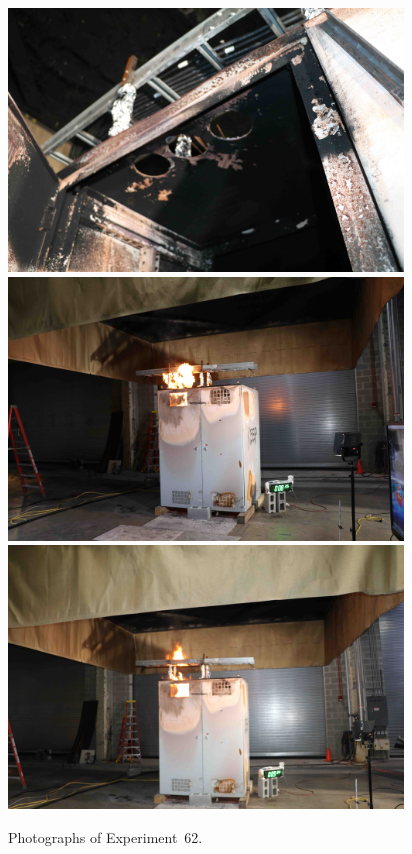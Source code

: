 \documentclass[12pt]{article}
\begin{document}
\begin{figure}[p]
\centering
\includegraphics[height=2.75in]{../FIGURES/Test_62_cables} \\
\includegraphics[height=2.75in]{../FIGURES/Test_62_8_min_35_s} \\
\includegraphics[height=2.75in]{../FIGURES/Test_62_9_min_34_s}
\caption[Photographs of Experiment~62]{Photographs of Experiment~62.}
\label{fig:Test_62_photos}
\end{figure}


\clearpage
\end{document}
